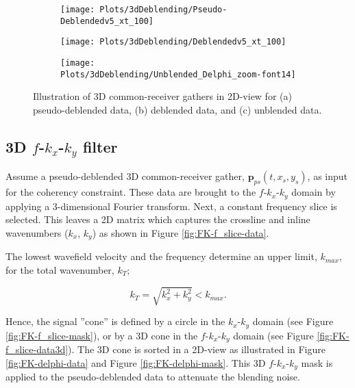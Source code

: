 \documentclass{madrid15WS}
\begin{document}
\begin{figure}[h!]
	\centering
	\begin{subfigure}[t]{0.8\textwidth}
	\texttt{[image: Plots/3dDeblending/Pseudo-Deblendedv5\_xt\_100]}
	\caption{}
	\label{fig:3D-CRG-Pps}
	\end{subfigure}
	
	\centering
	\begin{subfigure}[t]{0.8\textwidth}
	\texttt{[image: Plots/3dDeblending/Deblendedv5\_xt\_100]}
	\caption{}
	\label{fig:3D-CRG-Pdebl}
	\end{subfigure}
	
	\centering
	\begin{subfigure}[t]{0.8\textwidth}
	\texttt{[image: Plots/3dDeblending/Unblended\_Delphi\_zoom-font14]}
	\caption{}
	\label{fig:3D-CRG-Punbl}
	\end{subfigure}
	
	\caption{Illustration of 3D common-receiver gathers in 2D-view for (a) pseudo-deblended data, (b) deblended data, and (c) unblended data.}
	\label{fig:3D-CRG-2D-view}
\end{figure}

\subsection{3D $f$-$k_x$-$k_y$ filter}

Assume a pseudo-deblended 3D common-receiver gather, $\mathbf{p}_{ps}(t, x_s, y_s)$, as input for the coherency constraint. These data are brought to the $f$-$k_x$-$k_y$ domain by applying a 3-dimensional Fourier transform. Next, a constant frequency slice is selected. This leaves a 2D matrix which captures the crossline and inline wavenumbers ($k_x$, $k_y$) as shown in Figure \ref{fig:FK-f_slice-data}.

The lowest wavefield velocity and the frequency determine an upper limit, $k_{max}$, for the total wavenumber, $k_T$; 

\begin{equation}
	k_{T} = \sqrt{k_x^2 + k_y^2} < k_{max}.
	\label{eq:kT}
\end{equation}

Hence, the signal ”cone” is defined by a circle in the $k_x$-$k_y$ domain (see Figure \ref{fig:FK-f_slice-mask}), or by a 3D cone in the $f$-$k_x$-$k_y$ domain (see Figure \ref{fig:FK-f_slice-data3d}). The 3D cone is sorted in a 2D-view as illustrated in Figure \ref{fig:FK-delphi-data} and Figure \ref{fig:FK-delphi-mask}. This 3D $f$-$k_x$-$k_y$ mask is applied to the pseudo-deblended data to attenuate the blending noise.
\end{document}
